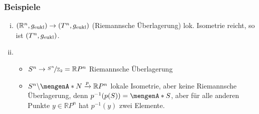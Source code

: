 \subsubsection{Beispiele}
\label{ssub:257}
\begin{enumerate}[(i)]
\item $\enbrace{\mathds{R}^n,g_{\text{eukl}}} \to \enbrace{T^n,g_{\text{eukl}}}$ (Riemannsche Überlagerung) lok. Isometrie reicht, so ist $\enbrace{T^n,g_{\text{eukl}}}$.
\item 
\begin{itemize}
\item $S^n\to \nicefrac{S^n}{\mathds{Z}_2} = \mathds{R}P^n$ Riemannsche Überlagerung
\item $S^n \backslash \set{N} \xrightarrow{p} \mathds{R}P^n$ lokale Isometrie, aber keine Riemannsche Überlagerung, denn $p^{-1}(p(S)) = \set{S}$, aber für alle anderen Punkte $y\in  \mathds{R}P^n$ hat $p^{-1}(y)$ zwei Elemente.
\end{itemize}
\end{enumerate}



\cleardoubleoddemptypage
{}
\setcounter{page}{1}
\printindex
\listoffigures


